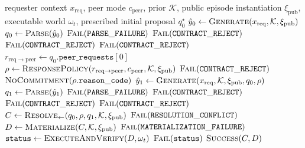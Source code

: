 \documentclass[sigconf,nonacm,balance=false]{aamas}
\begin{document}
\begin{algorithm}[!htbp]
  \caption{Feedback resolution from the prescribed initialization}
  \label{alg:feedback}
  \footnotesize
  \begin{algorithmic}[1]
    \Require requester context $x_{\mathrm{req}}$, peer mode $c_{\mathrm{peer}}$, prior $\mathcal K$, public episode instantiation $\xi_{\mathrm{pub}}$, executable world $\omega_t$, prescribed initial proposal $q_0^\star$
    \State $\hat y_0 \gets \textsc{Generate}(x_{\mathrm{req}},\mathcal K,\xi_{\mathrm{pub}})$
    \State $q_0 \gets \textsc{Parse}(\hat y_0)$
     \State \Return $\textsc{Fail}(\mathtt{PARSE\_FAILURE})$ \EndIf
      \State \Return $\textsc{Fail}(\mathtt{CONTRACT\_REJECT})$
    \EndIf
      \State \Return $\textsc{Fail}(\mathtt{CONTRACT\_REJECT})$
    \EndIf
     \State \Return $\textsc{Fail}(\mathtt{CONTRACT\_REJECT})$ \EndIf
    \State $r_{\mathrm{req}\rightarrow\mathrm{peer}}\gets q_0.\mathtt{peer\_requests}[0]$
    \State $\rho \gets \textsc{ResponsePolicy}(r_{\mathrm{req}\rightarrow\mathrm{peer}},c_{\mathrm{peer}},\mathcal K,\xi_{\mathrm{pub}})$
      \State \Return $\textsc{Fail}(\mathtt{CONTRACT\_REJECT})$
    \EndIf
      \State \Return $\textsc{NoCommitment}(\rho.\mathtt{reason\_code})$
    \EndIf
    \State $\hat y_1 \gets \textsc{Generate}(x_{\mathrm{req}},\mathcal K,\xi_{\mathrm{pub}},q_0,\rho)$ 
    \State $q_1 \gets \textsc{Parse}(\hat y_1)$
     \State \Return $\textsc{Fail}(\mathtt{PARSE\_FAILURE})$ \EndIf
      \State \Return $\textsc{Fail}(\mathtt{CONTRACT\_REJECT})$
    \EndIf
      \State \Return $\textsc{Fail}(\mathtt{CONTRACT\_REJECT})$
    \EndIf
      \State \Return $\textsc{Fail}(\mathtt{CONTRACT\_REJECT})$
    \EndIf
    \State $C \gets \textsc{Resolve}_{\leftarrow}(q_0,\rho,q_1,\mathcal K,\xi_{\mathrm{pub}})$
     \State \Return $\textsc{Fail}(\mathtt{RESOLUTION\_CONFLICT})$ \EndIf
    \State $D \gets \textsc{Materialize}(C,\mathcal K,\xi_{\mathrm{pub}})$
     \State \Return $\textsc{Fail}(\mathtt{MATERIALIZATION\_FAILURE})$ \EndIf
    \State $\mathtt{status}\gets\textsc{ExecuteAndVerify}(D,\omega_t)$
     \State \Return $\textsc{Fail}(\mathtt{status})$ \EndIf
    \State \Return $\textsc{Success}(C,D)$
  \end{algorithmic}
\end{algorithm}
\end{document}

